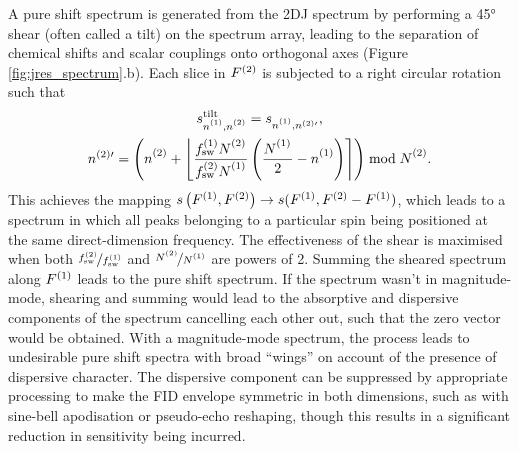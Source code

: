 A pure shift spectrum is generated from the \ac{2DJ} spectrum by performing a
\ang{45} shear (often called a tilt) on the spectrum array, leading to the
separation of chemical shifts and scalar couplings onto orthogonal axes (Figure
\ref{fig:jres_spectrum}.b). Each slice in $F^{(2)}$ is subjected to a right
circular rotation such that
\begin{subequations}
    \begin{gather}
        s_{\none,\ntwo}^{\text{tilt}} =
            s_{\none,n^{(2)\prime}},\\
        n^{(2)\prime} = \left(\ntwo + \left\lfloor
                \frac
                    {\fswone \Ntwo\vpsub{\mathrm{sw}}}
                    {\fswtwo \None\vpsub{\mathrm{sw}}}
                \left(
                    \frac{\None\vpsub{\mathrm{sw}}}{2} - \none
                \right)
            \right\rceil
        \right) \bmod \Ntwo.
    \end{gather}
\end{subequations}
This achieves the mapping $s\left(F^{(1)},F^{(2)}\right) \rightarrow s(F^{(1)}, F^{(2)}
- F^{(1)})$, which leads to a spectrum in which all peaks belonging to a
particular spin being positioned at the same direct-dimension frequency. The
effectiveness of the shear is maximised when both $\nicefrac{f_{\mathrm{sw}}^{(2)}}{f_{\mathrm{sw}}^{(1)}}$
and $\nicefrac{\Ntwo}{\None}$ are powers of 2. Summing the
sheared spectrum along $F^{(1)}$ leads to the pure shift spectrum.
If the spectrum wasn't in magnitude-mode, shearing and summing would lead to
the absorptive and dispersive components of the spectrum cancelling each other
out, such that the zero vector would be obtained.
With a magnitude-mode spectrum, the process leads to undesirable pure shift
spectra with broad ``wings'' on account of the presence of dispersive
character. The dispersive component can be suppressed by appropriate processing
to make the FID envelope symmetric in both dimensions, such as with sine-bell
apodisation or pseudo-echo reshaping\cite{Bax1981}, though this results in a
significant reduction in sensitivity being incurred.

